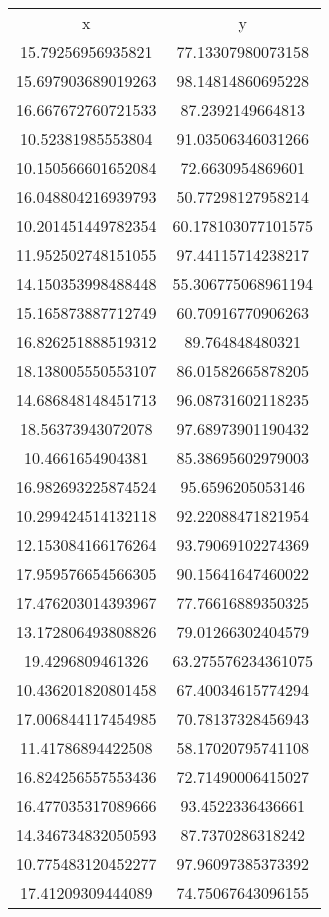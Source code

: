 \begin{table}
\begin{tabular}{cc}
x & y \\
15.79256956935821 & 77.13307980073158 \\
15.697903689019263 & 98.14814860695228 \\
16.667672760721533 & 87.2392149664813 \\
10.52381985553804 & 91.03506346031266 \\
10.150566601652084 & 72.6630954869601 \\
16.048804216939793 & 50.77298127958214 \\
10.201451449782354 & 60.178103077101575 \\
11.952502748151055 & 97.44115714238217 \\
14.150353998488448 & 55.306775068961194 \\
15.165873887712749 & 60.70916770906263 \\
16.826251888519312 & 89.764848480321 \\
18.138005550553107 & 86.01582665878205 \\
14.686848148451713 & 96.08731602118235 \\
18.56373943072078 & 97.68973901190432 \\
10.4661654904381 & 85.38695602979003 \\
16.982693225874524 & 95.6596205053146 \\
10.299424514132118 & 92.22088471821954 \\
12.153084166176264 & 93.79069102274369 \\
17.959576654566305 & 90.15641647460022 \\
17.476203014393967 & 77.76616889350325 \\
13.172806493808826 & 79.01266302404579 \\
19.4296809461326 & 63.275576234361075 \\
10.436201820801458 & 67.40034615774294 \\
17.006844117454985 & 70.78137328456943 \\
11.41786894422508 & 58.17020795741108 \\
16.824256557553436 & 72.71490006415027 \\
16.477035317089666 & 93.4522336436661 \\
14.346734832050593 & 87.7370286318242 \\
10.775483120452277 & 97.96097385373392 \\
17.41209309444089 & 74.75067643096155 \\

\end{tabular}
\end{table}
